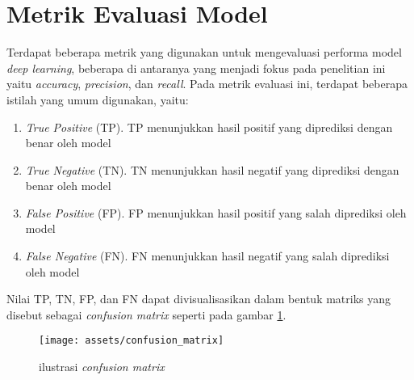 \documentclass[a4paper,12pt]{report}
\begin{document}
\section{Metrik Evaluasi Model}
Terdapat beberapa metrik yang digunakan untuk mengevaluasi performa model \textit{deep learning}, beberapa di antaranya yang menjadi fokus pada penelitian ini yaitu \textit{accuracy}, \textit{precision}, dan \textit{recall}. Pada metrik evaluasi ini, terdapat beberapa istilah yang umum digunakan, yaitu: 
\begin{enumerate}
	\item \textit{True Positive} (TP). TP menunjukkan hasil positif yang diprediksi dengan benar oleh model
	\item \textit{True Negative} (TN). TN menunjukkan hasil negatif yang diprediksi dengan benar oleh model
	\item \textit{False Positive} (FP). FP menunjukkan hasil positif yang salah diprediksi oleh model
	\item \textit{False Negative} (FN). FN menunjukkan hasil negatif yang salah diprediksi oleh model
\end{enumerate}

Nilai TP, TN, FP, dan FN dapat divisualisasikan dalam bentuk matriks yang disebut sebagai \textit{confusion matrix} seperti pada gambar \ref{conf_mat}.

\begin{figure}[H]
	\center \texttt{[image: assets/confusion\_matrix]}
	\caption{ilustrasi \textit{confusion matrix}} 
	\label{conf_mat}
\end{figure}
\end{document}
